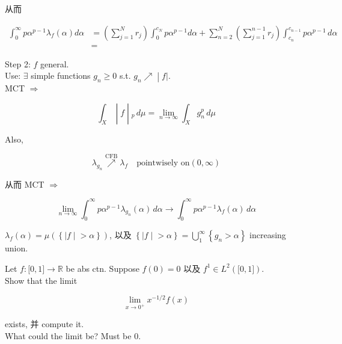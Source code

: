 从而

\[\begin{matrix}
{\int_{0}^{\infty}p\alpha^{p - 1}\lambda_{f}(\alpha)d\alpha} & {= (\sum\limits_{j = 1}^{N}r_{j})\int_{0}^{c_{N}}p\alpha^{p - 1}d\alpha + \sum\limits_{n = 2}^{N}(\sum\limits_{j = 1}^{n - 1}r_{j})\int_{c_{n}}^{c_{n - 1}}p\alpha^{p - 1}\, d\alpha} \\
 & =
\end{matrix}\]

Step 2: \(f\) general.\\
Use: \(\exists\) simple functions \(g_{n} \geq 0\) s.t. \(\left. g_{n}\operatorname{\nearrow } \middle| f| \right.\).\\
MCT \(\Longrightarrow\)

\[\left. \int_{X} \middle| f \middle| {}_{p}\, d\mu = \lim\limits_{n\rightarrow\infty}\int_{X}g_{n}^{p}\, d\mu \right.\]

Also,

\[\lambda_{g_{n}}\operatorname{\nearrow }\limits^{\text{CFB}}\lambda_{f}\quad\text{pointwisely on}(0,\infty)\]

从而 MCT \(\Longrightarrow\)

\[\lim\limits_{n\rightarrow\infty}\int_{0}^{\infty}p\alpha^{p - 1}\lambda_{g_{n}}(\alpha)\, d\alpha\rightarrow\int_{0}^{\infty}p\alpha^{p - 1}\lambda_{f}(\alpha)\, d\alpha\]

\(\lambda_{f}(\alpha) = \mu(\left\{ |f \middle| > \alpha \right\})\), 以及 \(\left\{ |f \middle| > \alpha \right\} = \bigcup_{1}^{\infty}\left\{ {g_{n} > \alpha} \right\}\) increasing union.

\begin{example}

Let \(f:\lbrack 0,1\rbrack\rightarrow\mathbb{R}\) be abs ctn. Suppose \(f(0) = 0\) 以及 \(f^{1} \in L^{2}(\lbrack 0,1\rbrack)\).\\
Show that the limit

\[\lim\limits_{x\rightarrow 0^{+}}x^{- 1/2}f(x)\]

exists, 并 compute it.\\
What could the limit be? Must be \(0\).\\

\end{example}

